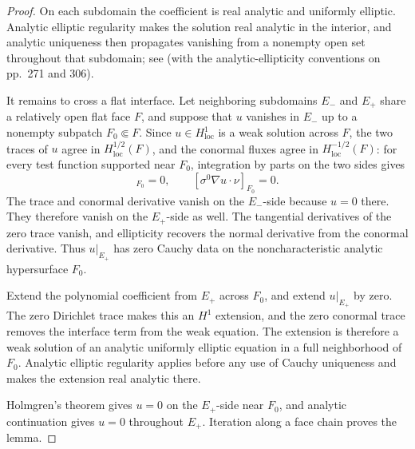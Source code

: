 \documentclass[11pt,oneside]{article}
\begin{document}
\begin{proof}
On each subdomain the coefficient is real analytic and uniformly elliptic.
Analytic elliptic regularity makes the solution real analytic in the interior,
and analytic uniqueness then propagates vanishing from a nonempty open set
throughout that subdomain; see
\cite[Theorem 8.6.5, p.~309]{Hormander1983} (with the analytic-ellipticity
conventions on pp.~271 and 306).

It remains to cross a flat interface.  Let neighboring
subdomains \(E_-\) and \(E_+\) share a relatively open flat face \(F\), and
suppose that \(u\) vanishes in \(E_-\) up to a nonempty subpatch
\(F_0\Subset F\).  Since \(u\in H^1_{\mathrm{loc}}\) is a weak solution across
\(F\), the two traces of \(u\) agree in \(H^{1/2}_{\mathrm{loc}}(F)\), and the
conormal fluxes agree in \(H^{-1/2}_{\mathrm{loc}}(F)\): for every test function
supported near \(F_0\), integration by parts on the two sides gives
\begin{equation}
  [u]_{F_0}=0,
  \qquad
  [\sigma^0\nabla u\cdot\nu]_{F_0}=0 .
  \label{eq:transmission-traces-ucp}
\end{equation}
The trace and conormal derivative vanish on the \(E_-\)-side because \(u=0\)
there.  They therefore vanish on the \(E_+\)-side as well.  The tangential
derivatives of the zero trace vanish, and ellipticity recovers the normal
derivative from the conormal derivative.  Thus \(u|_{E_+}\) has zero Cauchy
data on the noncharacteristic analytic hypersurface \(F_0\).

Extend the polynomial coefficient from \(E_+\) across \(F_0\), and extend
\(u|_{E_+}\) by zero.  The zero Dirichlet trace makes this an \(H^1\) extension,
and the zero conormal trace removes the interface term from the weak equation.
The extension is therefore a weak solution of an analytic uniformly elliptic
equation in a full neighborhood of \(F_0\).  Analytic elliptic regularity
applies before any use of Cauchy uniqueness and makes the extension real
analytic there.

Holmgren's theorem \cite{John1982} gives \(u=0\) on the \(E_+\)-side near
\(F_0\), and analytic continuation gives \(u=0\) throughout \(E_+\).  Iteration
along a face chain proves the lemma.
\end{proof}
\end{document}
